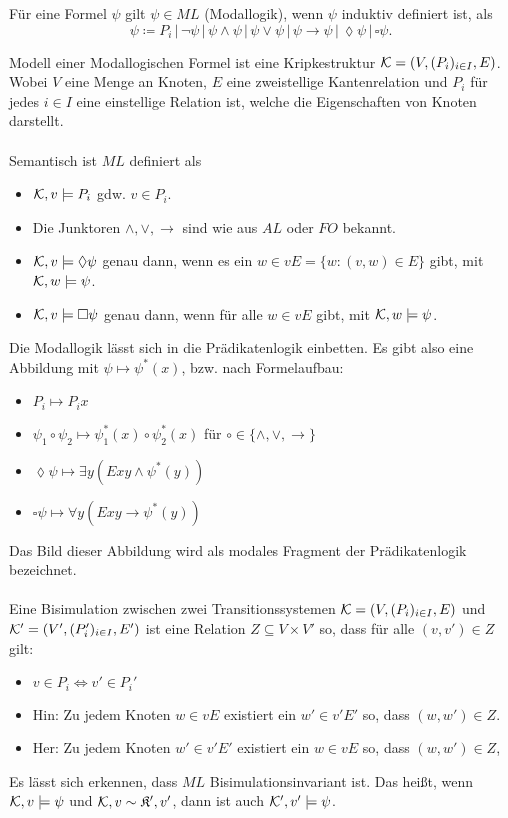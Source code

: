 Für eine Formel $\psi$ gilt $\psi\in ML$ (Modallogik), wenn $\psi$ induktiv definiert ist, als
\[\psi\coloneqq P_i \,\vert\, \neg\psi \,\vert\, \psi\land\psi \,\vert\, \psi\lor\psi \,\vert\, \psi\rightarrow\psi \,\vert\, \lozenge\psi \,\vert\, \square\psi.\]

Modell einer Modallogischen Formel ist eine Kripkestruktur $\mathcal{K}=(V,(P_i)_{i\in I}, E)$. Wobei $V$ eine Menge an Knoten, $E$ eine zweistellige Kantenrelation und $P_i$ für jedes $i\in I$ eine einstellige Relation ist, welche die Eigenschaften von Knoten darstellt.
\\
\\
Semantisch ist $ML$ definiert als
\begin{itemize}
	\item $\mathcal{K},v\models P_i$ gdw. $v\in P_i$.
	\item Die Junktoren $\land,\lor,\rightarrow$ sind wie aus $AL$ oder $FO$ bekannt.
	\item $\mathcal{K},v\models \lozenge \psi$ genau dann, wenn es ein $w\in vE=\{w:(v,w)\in E\}$ gibt, mit $\mathcal{K},w\models \psi$.
	\item $\mathcal{K},v\models \square \psi$ genau dann, wenn für alle $w\in vE$ gibt, mit $\mathcal{K},w\models \psi$.
\end{itemize}
Die Modallogik lässt sich in die Prädikatenlogik einbetten. Es gibt also eine Abbildung mit $\psi\mapsto \psi^\ast(x)$, bzw. nach Formelaufbau:

\begin{itemize}
	\item $P_i\mapsto P_i x$
	\item $\psi_1\circ \psi_2\mapsto \psi_1^\ast(x)\circ\psi_2^\ast(x)$ für $\circ\in\{\land,\lor,\rightarrow\}$
	\item $\lozenge\psi\mapsto\exists y (Exy \land \psi^\ast(y))$
	\item $\square\psi \mapsto \forall y (Exy\rightarrow \psi^\ast(y))$
\end{itemize}
Das Bild dieser Abbildung wird als modales Fragment der Prädikatenlogik bezeichnet.
\\
\\
Eine Bisimulation zwischen zwei Transitionssystemen $\mathcal{K}=(V,(P_i)_{i\in I}, E)$ und $\mathcal{K}'=(V',(P_i')_{i\in I}, E')$ ist eine Relation $Z\subseteq V\times V'$ so, dass für alle $(v,v')\in Z$ gilt:
\begin{itemize}
	\item $v\in P_i\Leftrightarrow v'\in P_i'$
	\item Hin: Zu jedem Knoten $w\in vE$ existiert ein $w'\in v'E'$ so, dass $(w,w')\in Z$.
	\item Her: Zu jedem Knoten $w'\in v'E'$ existiert ein $w\in vE$ so, dass $(w,w')\in Z$,
\end{itemize}
Es lässt sich erkennen, dass $ML$ Bisimulationsinvariant ist. Das heißt, wenn $\mathcal{K},v\models \psi$ und $\mathcal{K},v\sim \mathfrak{K'},v'$, dann ist auch $\mathcal{K}',v'\models \psi$.


